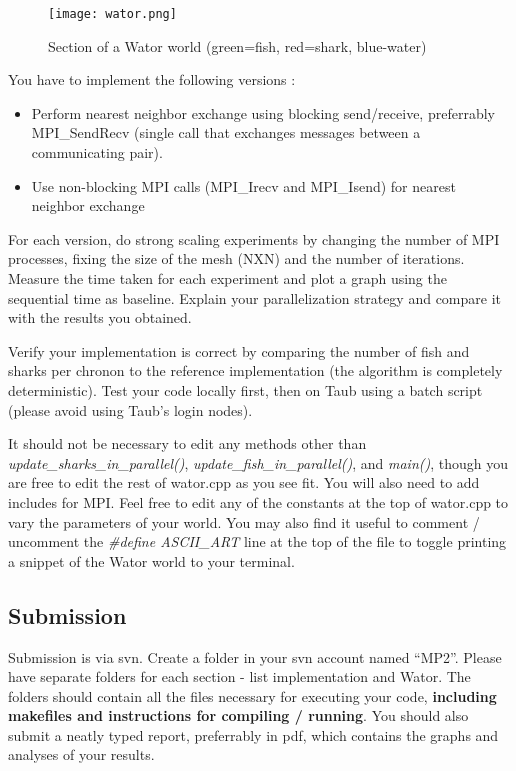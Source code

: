 \documentclass[12pt]{article}
\begin{document}
\begin{figure}
\caption{Section of a Wator world (green=fish, red=shark, blue-water)}
\texttt{[image: wator.png]}
\centering
\end{figure}

You have to implement the following versions :

\begin{itemize}
\item Perform nearest neighbor exchange using blocking send/receive, preferrably MPI\_SendRecv (single call that exchanges messages between a communicating pair).
\item Use non-blocking MPI calls (MPI\_Irecv and MPI\_Isend) for nearest neighbor exchange
\end{itemize}

For each version, do strong scaling experiments by changing the number of MPI processes, fixing the size of the mesh (NXN) and the number of iterations.
Measure the time taken for each experiment and plot a graph using the sequential time as baseline.
Explain your parallelization strategy and compare it with the results you obtained.


Verify your implementation is correct by comparing the number of fish and sharks per chronon to the reference implementation (the algorithm is completely deterministic). Test your code locally first, then on Taub using a batch script (please avoid using Taub's login nodes).

It should not be necessary to edit any methods other than \textit{update\_sharks\_in\_parallel()}, \textit{update\_fish\_in\_parallel()}, and \textit{main()}, though you are free to edit the rest of wator.cpp as you see fit. You will also need to add includes for MPI. Feel free to edit any of the constants at the top of wator.cpp to vary the parameters of your world. You may also find it useful to comment / uncomment the \textit{\#define ASCII\_ART} line at the top of the file to toggle printing a snippet of the Wator world to your terminal.

\subsection{Submission}

Submission is via svn. Create a folder in your svn account named ``MP2''. Please have separate folders for each section - list implementation and Wator. The folders should contain all the files necessary for executing your code, \textbf{including makefiles and instructions for compiling / running}. You should also submit a neatly typed report, preferrably in pdf, which contains the graphs and analyses of your results.
\end{document}
